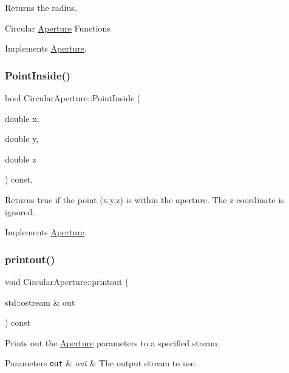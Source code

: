 Returns the radius.

Circular \hyperlink{classAperture}{Aperture} Functions 

Implements \hyperlink{classAperture_ad0ea7907d393ec1e6a8303343fe9dd29}{Aperture}.

\mbox{\label{classCircularAperture_a1cc2c7d1ff491dbfb0c24790897d4519}} 
\subsubsection{\texorpdfstring{Point\+Inside()}{PointInside()}}
{\footnotesize\ttfamily bool Circular\+Aperture\+::\+Point\+Inside (\begin{DoxyParamCaption}\item[{double}]{x,  }\item[{double}]{y,  }\item[{double}]{z }\end{DoxyParamCaption}) const\hspace{0.3cm}{\ttfamily [inline]}, {\ttfamily [virtual]}}

Returns true if the point (x,y,z) is within the aperture. The z coordinate is ignored. 

Implements \hyperlink{classAperture_a77854d058bf8a00cfeb7a6d766dc0028}{Aperture}.

\mbox{\label{classCircularAperture_af7380933fd3494dd0d1868b655a78b08}} 
\subsubsection{\texorpdfstring{printout()}{printout()}}
{\footnotesize\ttfamily void Circular\+Aperture\+::printout (\begin{DoxyParamCaption}\item[{std\+::ostream \&}]{out }\end{DoxyParamCaption}) const\hspace{0.3cm}{\ttfamily [virtual]}}

Prints out the \hyperlink{classAperture}{Aperture} parameters to a specified stream. 
\begin{DoxyParams}[1]{Parameters}
\mbox{\tt out}  & {\em out} & The output stream to use. \\
\hline
\end{DoxyParams}


